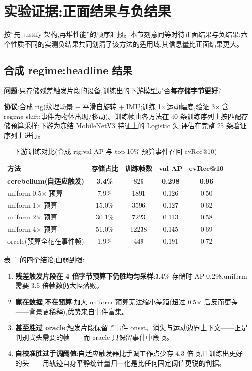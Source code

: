 \documentclass[UTF8,12pt,a4paper]{ctexart}
\begin{document}
\section{实验证据:正面结果与负结果}

按``先 justify 架构,再堆性能''的顺序汇报。本节刻意同等对待正面结果与负结果:六个性质不同的实测负结果共同划清了该方法的适用域,其信息量比正面结果更大。

\subsection{合成 regime:headline 结果}

\textbf{问题}:只存储残差触发片段的设备,训练出的下游模型是否\textbf{每存储字节更好}?

\textbf{协议}:合成 rig(纹理场景 + 平滑自旋转 + IMU;训练 1$\times$运动幅度,验证 3$\times$,含 regime shift;事件为物体出现/移动)。训练帧由各方法在 40 条训练序列上按匹配存储预算采样;下游为冻结 MobileNetV3 特征上的 Logistic 头;评估在完整 25 条验证序列上进行。

\begin{table}[htbp]
  \centering
  \small
  \caption{下游训练对比(合成 rig;val AP 与 top-10\% 预算事件召回 evRec@10)}
  \label{tab:headline}
  \begin{tabular}{lcccc}
    \toprule
    方法 & 存储占比 & 训练帧数 & val AP & evRec@10 \\
    \midrule
    \textbf{cerebellum(自适应触发)} & \textbf{3.4\%} & 826 & \textbf{0.298} & \textbf{0.96} \\
    uniform 0.5$\times$ 预算 & 7.9\% & 1891 & 0.126 & 0.50 \\
    uniform 1$\times$ 预算 & 15.0\% & 3596 & 0.127 & 0.62 \\
    uniform 2$\times$ 预算 & 30.1\% & 7223 & 0.113 & 0.58 \\
    uniform 4$\times$ 预算 & 51.0\% & 12238 & 0.145 & 0.69 \\
    oracle(预算全花在事件帧) & 1.9\% & 449 & 0.191 & 0.72 \\
    \bottomrule
  \end{tabular}
\end{table}

表~\ref{tab:headline} 的四个结论,由弱到强:

\begin{enumerate}
  \item \textbf{残差触发片段在 4 倍字节预算下仍胜均匀采样}:3.4\% 存储时 AP 0.298,uniform 需要 3.5 倍帧数仍大幅落败。
  \item \textbf{赢在数据,不在预算}:加大 uniform 预算无法缩小差距(超过 0.5$\times$ 后反而更差——背景更稀释),优势来自事件富集。
  \item \textbf{甚至胜过 oracle}:触发片段保留了事件 onset、消失与运动边界上下文——正是判别式头需要的帧——而 oracle 只保留事件中段帧。
  \item \textbf{自校准胜过手调阈值}:自适应触发器比手调工作点少存 4.3 倍帧,且训练出更好的头——用轨迹自身平静统计量归一化是比任何固定阈值更锐的判据。
\end{enumerate}
\end{document}
